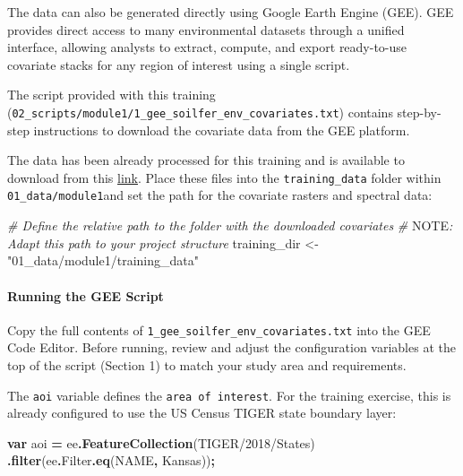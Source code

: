 \documentclass[
  10pt,
  b5paper,
  oneside]{book}
\newenvironment{Shaded}{\begin{snugshade}}{\end{snugshade}}
\newcommand{\AlertTok}[1]{\textcolor[rgb]{0.94,0.16,0.16}{#1}}
\newcommand{\AttributeTok}[1]{\textcolor[rgb]{0.13,0.29,0.53}{#1}}
\newcommand{\CommentTok}[1]{\textcolor[rgb]{0.56,0.35,0.01}{\textit{#1}}}
\newcommand{\FunctionTok}[1]{\textcolor[rgb]{0.13,0.29,0.53}{\textbf{#1}}}
\newcommand{\KeywordTok}[1]{\textcolor[rgb]{0.13,0.29,0.53}{\textbf{#1}}}
\newcommand{\NormalTok}[1]{#1}
\newcommand{\OperatorTok}[1]{\textcolor[rgb]{0.81,0.36,0.00}{\textbf{#1}}}
\newcommand{\OtherTok}[1]{\textcolor[rgb]{0.56,0.35,0.01}{#1}}
\newcommand{\StringTok}[1]{\textcolor[rgb]{0.31,0.60,0.02}{#1}}
\begin{document}
The data can also be generated directly using Google Earth Engine (GEE). GEE provides direct access to many environmental datasets through a unified interface, allowing analysts to extract, compute, and export ready-to-use covariate stacks for any region of interest using a single script.

The script provided with this training (\texttt{02\_scripts/module1/1\_gee\_soilfer\_env\_covariates.txt}) contains step-by-step instructions to download the covariate data from the GEE platform.

The data has been already processed for this training and is available to download from this \href{https://drive.google.com/drive/folders/1EGrkhbMTi2qglemuD_onegAqLWZb3BbT}{link}. Place these files into the \texttt{training\_data} folder within \texttt{01\_data/module1}and set the path for the covariate rasters and spectral data:

\begin{Shaded}
\begin{Highlighting}[]
\CommentTok{\# Define the relative path to the folder with the downloaded covariates}
\CommentTok{\# }\AlertTok{NOTE}\CommentTok{: Adapt this path to your project structure}
\NormalTok{  training\_dir }\OtherTok{\textless{}{-}}\StringTok{"01\_data/module1/training\_data"}
\end{Highlighting}
\end{Shaded}

\paragraph*{Running the GEE Script}\label{running-the-gee-script}

Copy the full contents of \texttt{1\_gee\_soilfer\_env\_covariates.txt} into the GEE Code Editor. Before running, review and adjust the configuration variables at the top of the script (Section 1) to match your study area and requirements.

The \texttt{aoi} variable defines the \texttt{area\ of\ interest}. For the training exercise, this is already configured to use the US Census TIGER state boundary layer:

\begin{Shaded}
\begin{Highlighting}[]
\KeywordTok{var}\NormalTok{ aoi }\OperatorTok{=}\NormalTok{ ee}\OperatorTok{.}\FunctionTok{FeatureCollection}\NormalTok{(}\StringTok{\textquotesingle{}TIGER/2018/States\textquotesingle{}}\NormalTok{)}
  \OperatorTok{.}\FunctionTok{filter}\NormalTok{(ee}\OperatorTok{.}\AttributeTok{Filter}\OperatorTok{.}\FunctionTok{eq}\NormalTok{(}\StringTok{\textquotesingle{}NAME\textquotesingle{}}\OperatorTok{,} \StringTok{\textquotesingle{}Kansas\textquotesingle{}}\NormalTok{))}\OperatorTok{;}
\end{Highlighting}
\end{Shaded}
\end{document}
